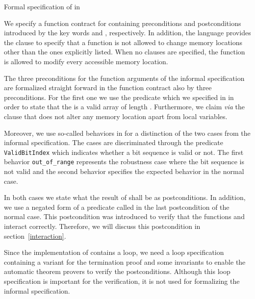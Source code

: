 \begin{listing}[hbt]
\begin{minipage}{\textwidth}

\end{minipage}
\caption{\label{fig:spec-peek} Formal specification of \peek in \acsl}
\end{listing}

We specify a function contract for \peek containing preconditions
and postconditions introduced by the key words 
and , respectively.
In addition, the \acsl language provides the  clause to specify 
that a function is not allowed to change memory locations other than the ones 
explicitly listed. 
When no  clauses are specified, 
the function is allowed to modify every accessible memory location. 

The three preconditions for the function arguments of the informal specification 
are formalized straight forward in the function contract also by three preconditions.
For the first one we use the predicate 
which we specified in \acsl in order to state that the 
is a valid array of length .
Furthermore, we claim {\it via} the  clause 
that \peek does not alter any memory location
apart from local variables.

Moreover, we use so-called behaviors in \acsl for a distinction of the two cases
from the informal specification.
The cases are discriminated through the predicate \texttt{ValidBitIndex}
which indicates whether a bit sequence is valid or not.
The first behavior \texttt{out\_of\_range} represents the robustness 
case where the bit sequence is not valid and 
the second behavior specifies the expected behavior in the normal case.

In both cases we state what the result of \peek shall be 
as postconditions. In addition, we use a negated form of
a predicate called  in the last postcondition of
the normal case. This postcondition was introduced to verify
that the functions \peek and \poke interact correctly.
Therefore, we will discuss this postcondition in section~\ref{interaction}.

Since the implementation of \peek contains a loop,
we need a loop specification containing a variant for the termination
proof and some invariants to enable the automatic theorem provers
to verify the postconditions.
Although this loop specification is important for the verification,
it is not used for formalizing the informal specification.

